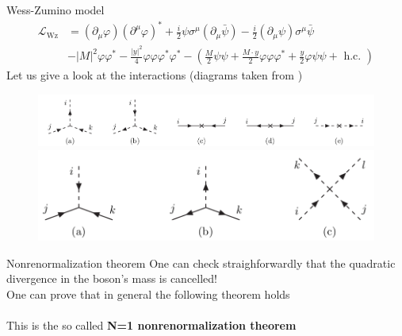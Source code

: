\documentclass[10pt]{beamer}
\begin{document}
\begin{frame}{Wess-Zumino model}
    \begin{equation*}
        \begin{aligned}
            \mathcal{L}_{\mathrm{Wz}} &=\left(\partial_{\mu} \varphi\right)\left(\partial^{\mu} \varphi\right)^{*}+\frac{i}{2} \psi \sigma^{\mu}\left(\partial_{\mu} \bar{\psi}\right)-\frac{i}{2}\left(\partial_{\mu} \psi\right) \sigma^{\mu} \bar{\psi} \\
            &-|M|^{2} \varphi \varphi^{*}-\frac{|y|^{2}}{4} \varphi \varphi \varphi^{*} \varphi^{*}-\left(\frac{M}{2} \psi \psi+\frac{M \cdot y}{2} \varphi \varphi \varphi^{*}+\frac{y}{2} \varphi \psi \psi+\text { h.c. }\right)
            \end{aligned}
    \end{equation*}
    Let us give a look at the interactions (diagrams taken from \cite{MARTIN_1998})
        \begin{figure}
            \centering
            \includegraphics[scale=0.22]{feynman1.png}
            \includegraphics[scale=0.22]{feynman2.png}
        \end{figure}
\end{frame}

\begin{frame}{Nonrenormalization theorem}
    One can check straighforwardly that the quadratic divergence in the boson's mass is cancelled! \\
    One can prove that in general the following theorem holds \\ 
    \vspace{15pt}
    \\
    \vspace*{15pt}
    This is the so called \textbf{N=1 nonrenormalization theorem}
\end{frame}
    
\end{document}
